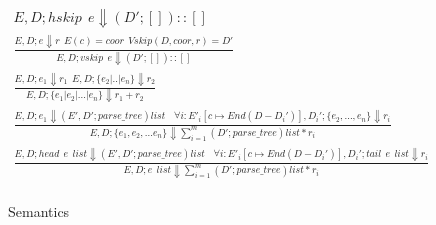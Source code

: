 \begin{figure}[ht!]
\begin{gather*}
  {E,D;hskip~~e \Downarrow (D';[])::[]}\\
  \tag{\sc E-Vskip}\label{rule:vskip}
  \frac
  {E,D;e \Downarrow r ~~ E(c)=coor ~~ Vskip(D, coor, r)=D'}
  {E,D;vskip~~e \Downarrow (D';[])::[]}\\
  \tag{\sc E-Union}\label{rule:union}
  \frac
  {E,D;e_1 \Downarrow r_1 ~~ E,D;\{e_2|..|e_n\} \Downarrow r_2}
  {E,D;\{e_1|e_2|...|e_n\} \Downarrow r_1+r_2}\\
  \tag{\sc E-Sturct}\label{rule:struct}
  \frac
  {E,D;e_1 \Downarrow (E',D';parse\_tree)list~~~~  \forall i:  E'_i[c \mapsto End(D-D_i')],D_i';\{e_2,...,e_n\} \Downarrow r_i}
  {E,D;\{e_1,e_2,...e_n\} \Downarrow \sum_{i=1}^{m} (D';parse\_tree)list*r_i}\\
  \tag{\sc E-List}\label{rule:list}
  \frac
  {E,D;head ~~e~~list \Downarrow (E',D';parse\_tree)list ~~~~ \forall i:  E'_i[c \mapsto End(D-D_i')],D_i';tail~~e~~list \Downarrow r_i}
  {E,D;e~~list \Downarrow \sum_{i=1}^{m} (D';parse\_tree)list*r_i}\\
\end{gather*}
\caption{Semantics}\label{fig:semantics}
\end{figure}
